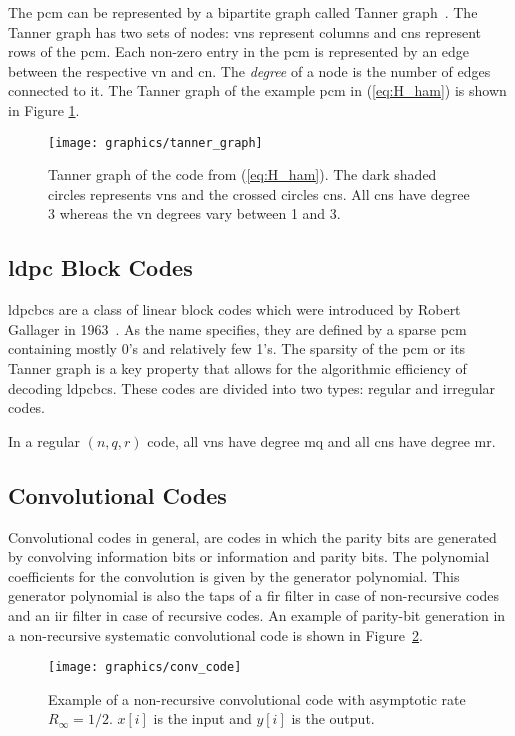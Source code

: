 The \gls{pcm} can be represented by a bipartite graph called Tanner graph~\cite{Tanner1981}. The Tanner graph has two sets of nodes: \glspl{vn} represent columns and \glspl{cn} represent rows of the \gls{pcm}. Each non-zero entry in the \gls{pcm} is represented by an edge between the respective \gls{vn} and \gls{cn}. The \emph{degree} of a node is the number of edges connected to it. The Tanner graph of the example \gls{pcm} in (\ref{eq:H_ham}) is shown in Figure \ref{fig:tannGraph}.

\begin{figure}[htbp]
  \centering
  \texttt{[image: graphics/tanner\_graph]}
  \caption[Tanner graph of an example Linear Block code.]{Tanner graph of the code from (\ref{eq:H_ham}). The dark shaded circles represents \glspl{vn} and the crossed circles \glspl{cn}. All \glspl{cn} have degree 3 whereas the \gls{vn} degrees vary between 1 and 3.}
  \label{fig:tannGraph}
\end{figure}

\subsection{\texorpdfstring{\acrlong{ldpc}}{LDPC} Block Codes}
\glspl{ldpcbc} are a class of linear block codes which were introduced by Robert Gallager in 1963~\cite{Gallager1963}. As the name specifies, they are defined by a sparse \gls{pcm} containing mostly 0's and relatively few 1's. The sparsity of the \gls{pcm} or its Tanner graph is a key property that allows for the algorithmic efficiency of decoding \glspl{ldpcbc}. These codes are divided into two types: regular and irregular codes.

In a regular $(n,q,r)$ code, all \glspl{vn} have degree \gls{mq} and all \glspl{cn} have degree \gls{mr}.

\subsection{Convolutional Codes}
Convolutional codes in general, are codes in which the parity bits are generated by convolving information bits or information and parity bits. The polynomial coefficients for the convolution is given by the generator polynomial. This generator polynomial is also the taps of a \gls{fir} filter in case of non-recursive codes and an \gls{iir} filter in case of recursive codes. An example of parity-bit generation in a non-recursive systematic convolutional code is shown in Figure~\ref{fig:conv_code}.
\begin{figure}[htbp]
  \centering
  \texttt{[image: graphics/conv\_code]}
  \caption[Example of a non-recursive convolutional code.]{Example of a non-recursive convolutional code with asymptotic rate $R_\infty=1/2$. $x[i]$ is the input and $y[i]$ is the output.}
  \label{fig:conv_code}
\end{figure}

